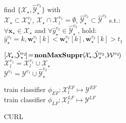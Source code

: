 \documentclass[journal,11pt]{IEEEtran}
\begin{document}
\begin{algorithm}[!tbp]
{{{{				find $\{\mathcal{X}_\star,\hat{\mathcal{Y}}_\star^{v_2} \}$ with \\
				$\mathcal{X}_\star \! \subset \! \mathcal{X}_u^{v_1}$, $\mathcal{X}_\star \! \cap \! \mathcal{X}_l^{v_1} \! = \! \emptyset$, $\hat{\mathcal{Y}}_\star^{v_2} \subset \hat{\mathcal{Y}}^{v_2}$ s.t.: \\
				$\forall \mathbf{x}_\star \! \in \! \mathcal{X}_\star$ and $\forall \hat{y}_\star^{v_2} \! \in \! \hat{\mathcal{Y}}_\star^{v_2}$, hold: \\ 
				$\hat{y}_\star^{v_2}=k, \mathbf{w}_\star^{v_1}[k]<\mathbf{w}_\star^{v_2}[k], \mathbf{w}_\star^{v_2}[k]  > \! t_1$\\

				$[\mathcal{X}_\star,\! \hat{\mathcal{Y}}_\star^{v_2} \!] \! = \! \text{\bf{nonMaxSuppr}}(\! \mathcal{X}_\star ,\! \hat{\mathcal{Y}}_\star^{v_2} ,\! \mathcal{W}^{v_2} \! )$ \\
				$\mathcal{X}_l^{v_1}=\mathcal{X}_l^{v_1} \cup {\mathcal{X}}_\star$ \\
				$\mathcal{Y}^{v_1}=\mathcal{Y}^{v_1} \cup \hat{\mathcal{Y}}_\star^{v_2}$ \\
				
						}
						
				}
				
				
			train classifier $\phi_{\scriptscriptstyle EF}: \mathcal{X}_l^{\scriptscriptstyle EF} \mapsto {\mathcal{Y}}^{\scriptscriptstyle EF}$\\
			train classifier $\phi_{\scriptscriptstyle LF}: \mathcal{X}_l^{\scriptscriptstyle LF} \mapsto {\mathcal{Y}}^{\scriptscriptstyle LF}$\\					
		}

} %
\label{alg:curl}
\caption{CURL}
\end{algorithm}
\end{document}
